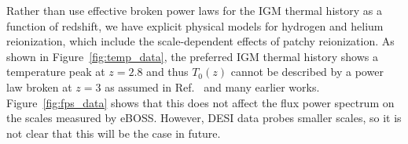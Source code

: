 
Rather than use effective broken power laws for the IGM thermal history as a function of redshift, we have explicit physical models for hydrogen and helium reionization, which include the scale-dependent effects of patchy reionization.
As shown in Figure~\ref{fig:temp_data}, the preferred IGM thermal history shows a temperature peak at $z=2.8$ and thus $T_0(z)$ cannot be described by a power law broken at $z=3$ as assumed in Ref.~\cite{2020JCAP...04..038P} and many earlier works.
Figure~\ref{fig:fps_data} shows that this does not affect the flux power spectrum on the scales measured by eBOSS.
However, DESI data probes smaller scales, so it is not clear that this will be the case in future. 





